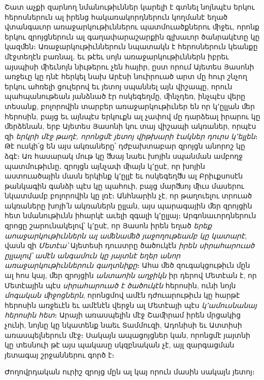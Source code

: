 \documentclass{article}
\begin{document}
{Շատ աչքի զարնող նմանութիւններ կարելի է գտնել նոյնպէս երկու հերոսներուն ալ իրենց հակառակորդներուն կողմանէ եղած վտանգաւոր առաջարկութիւններու պատմուածքներու ﬕջեւ, որոնք երկու զրոյցներուն ալ գաղափարաշարքին գլխաւոր ծանրակէտը կը կազﬔն։ Առաջարկութիւններուն նպատակն է հերոսներուն կեանքը մէջտեղէն բառնալ․ եւ թէեւ սոյն առաջարկութիւններն իբրեւ այսպիսի ﬕեւնոյն նիւթերու չեն հայիր, ըստ որում Այետես Յասոնի առջեւը կը դնէ հերկել նախ Արէսի նուիրուած արտ մը հուր շնչող երկու ահռելի ցուլերով եւ յետոյ սպաննել այն վիշապը, որուն պահպանութեան յանձնած էր ոսկեգեղմը, ﬕնչդեռ, ինչպէս վերը տեսանք, բոլորովին տարբեր առաջարկութիւներ են որ կ՚ըլլան ﬔր հերոսին, բայց եւ այնպէս երկուքն ալ չափով մը դարձեալ իրարու կը ﬔրձենան, երբ Այետես Յասոնի կու տայ վիշապի ակռաներ, որպէս զի \emph{երկրի մէջ թաղէ, որոնցմէ յետոյ վիթխարի էակներ դուրս կ՚ելլեն}։ Թէ ուսկի՛ց են այս ակռաները՝ դժբախտաբար զրոյցն անորոշ կը ձգէ։ Առ հասարակ մութ կը ﬓայ նաեւ խոյին սպանման ամբողջ պատմութիւնը․ զրոյցն այնչափ ﬕայն կ՚ըսէ, որ խոյին աստուածային մասն երկինք կ՚ըլլէ եւ ոսկեգեղﬓ ալ Բրիւքսոսէն թանկագին գանձի պէս կը պահուի, բայց մարﬓոյ ﬕւս մասերու նկատմամբ բոլորովին կը լռէ։ Անհնարին չէ, որ թաղուելու տրուած ակռաները խոյի՛ն ակռաներն ըլլան, այս պարագային ﬔր զրոյցին հետ նմանութիւնն իհարկէ աւելի զգալի կ՚ըլլայ։ Արգոնաւորդներուն զրոցը շարունակելով՝ կ՚ըսէ, որ Յասոն իրեն եղած \emph{երեք աոաջարկութիւններն ալ աﬔնաﬔծ յաջողութեամբ կը կատարէ}, վասն զի \emph{Մետէա՝} Այետեսի դուստրը ծածուկէն \emph{իրեն սիրահարուած ըլլալով՝ ամէն անգամուն կը յայտնէ եղեր անոր առաջարկութիւններուն գաղտնիքը}։ Ահա ﬔծ զուգակցութիւն մըն ալ հոս կայ, ﬔր զրոյցին \emph{անտաոին աղջիկն} իր դերով Մետէան է, որ Մետէային պէս \emph{սիրահարուած է ծածուկէն} հերոսին, ունի նոյն \emph{մոգական ﬕջոցներն}, որոնցմով ամէն դժուարութիւն կը հարթէ հերոսին առջեւէն եւ ամէնէն վերջն ալ Մետէայի պէս \emph{կ՚ամուսնանայ հերոսին հետ}։ Արայի առասպելին մէջ Շաﬕրամ իրեն մրցակից չունի, նոյնը կը նկատենք նաեւ Տամմուզի, Ադոնիսի եւ Ատտիսի առասպելներուն մէջ։ Սակայն ապացոյցներ կան, որոնցմէ յայտնի կը տեսնուի թէ այս պակասը սկզբնական չէ, այլ զարգացման յետագայ շրջաններու գործ է։

Ժողովրդական ուրիշ զրոյց մըն ալ կայ որուն մասին սակայն յետոյ։}
\clearpage
\subsection{}
\end{document}

